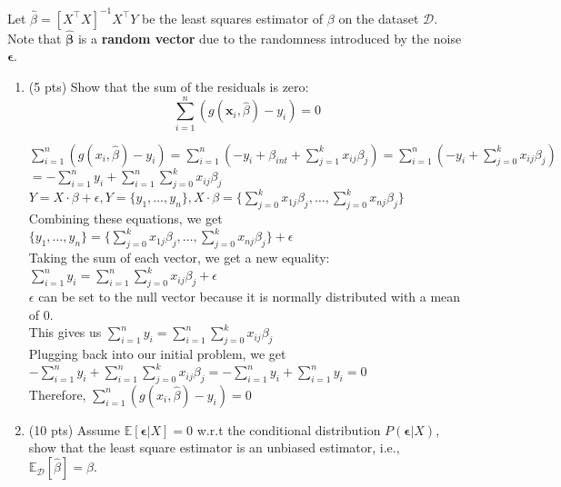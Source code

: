 \documentclass[11pt]{article}
\renewcommand{\vec}[1]{\mathbf{#1}}
\begin{document}
Let $\hat{\beta}=[X^\top X]^{-1}X^\top Y$ be the least squares estimator of $\beta$ on the dataset $\mathcal{D}$. Note that $\hat{\vec{\beta}}$ is a \textbf{random vector} due to the randomness introduced by the noise $\boldsymbol{\epsilon}$.
\begin{enumerate}
\item (5 pts) Show that the sum of the residuals is zero:
\[\sum_{i=1}^n(g(\mathbf{x}_i, \hat{\beta}) -y_i)=0\]

\begin{answertext}{6cm}{}

$\sum_{i=1}^{n} (g(x_i,\hat{\beta}) - y_i) = \sum_{i=1}^{n} (-y_i + \beta_{int} + \sum_{j=1}^{k} x_{ij}\beta_j) = \sum_{i=1}^{n} (-y_i + \sum_{j=0}^{k} x_{ij}\beta_j)$\\
$= -\sum_{i=1}^{n} y_i + \sum_{i=1}^{n} \sum_{j=0}^{k} x_{ij}\beta_j$\\
$Y = X \cdot \beta + \epsilon, Y = \{y_1, \dots, y_n\}, X \cdot \beta = \{\sum_{j=0}^{k} x_{1j}\beta_j, \dots, \sum_{j=0}^{k} x_{nj}\beta_j\}$\\
Combining these equations, we get $\{y_1, \dots, y_n\} = \{\sum_{j=0}^{k} x_{1j}\beta_j, \dots, \sum_{j=0}^{k} x_{nj}\beta_j\} + \epsilon$\\
Taking the sum of each vector, we get a new equality: $\sum_{i=1}^{n} y_i = \sum_{i=1}^{n} \sum_{j=0}^{k} x_{ij}\beta_j + \epsilon$\\
$\epsilon$ can be set to the null vector because it is normally distributed with a mean of $0$.\\
This gives us $\sum_{i=1}^{n}y_i = \sum_{i=1}^{n}\sum_{j=0}^{k}x_{ij}\beta_j$\\
Plugging back into our initial problem, we get\\
$-\sum_{i=1}^{n} y_i + \sum_{i=1}^{n} \sum_{j=0}^{k} x_{ij}\beta_j = -\sum_{i=1}^{n} y_i + \sum_{i=1}^{n} y_i = 0$\\
Therefore, $\sum_{i=1}^{n} (g(x_i,\hat{\beta}) - y_i) = 0$

\end{answertext} 
\pagebreak
\item (10 pts)  Assume  $\mathbb{E}[\boldsymbol{\epsilon}|X]=0$ w.r.t the conditional distribution $P(\boldsymbol{\epsilon}|X)$, show that the least square estimator is an unbiased estimator, i.e., $\mathbb{E}_{\mathcal{D}}[\hat{\beta}]=\beta$.

\begin{answertext}{9cm}{}



\end{answertext}
\end{enumerate}
\end{document}
